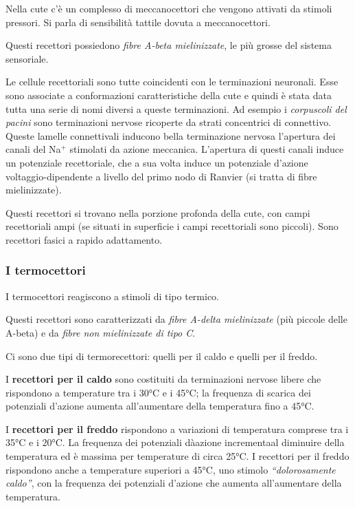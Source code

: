 \documentclass[]{article}
\begin{document}
Nella cute c'è un complesso di meccanocettori che vengono attivati da
stimoli pressori. Si parla di sensibilità tattile dovuta a
meccanocettori.

Questi recettori possiedono \emph{fibre A-beta mielinizzate}, le più
grosse del sistema sensoriale.

Le cellule recettoriali sono tutte coincidenti con le terminazioni
neuronali. Esse sono associate a conformazioni caratteristiche della
cute e quindi è stata data tutta una serie di nomi diversi a queste
terminazioni. Ad esempio i \emph{corpuscoli del pacini} sono
terminazioni nervose ricoperte da strati concentrici di connettivo.
Queste lamelle connettivali inducono bella terminazione nervosa
l'apertura dei canali del Na\(^+\) stimolati da azione meccanica.
L'apertura di questi canali induce un potenziale recettoriale, che a sua
volta induce un potenziale d'azione voltaggio-dipendente a livello del
primo nodo di Ranvier (si tratta di fibre mielinizzate).

Questi recettori si trovano nella porzione profonda della cute, con
campi recettoriali ampi (se situati in superficie i campi recettoriali
sono piccoli). Sono recettori fasici a rapido adattamento.

\subsubsection{I termocettori}\label{i-termocettori}

I termocettori reagiscono a stimoli di tipo termico.

Questi recettori sono caratterizzati da \emph{fibre A-delta
mielinizzate} (più piccole delle A-beta) e da \emph{fibre non
mielinizzate di tipo C}.

Ci sono due tipi di termorecettori: quelli per il caldo e quelli per il
freddo.

I \textbf{recettori per il caldo} sono costituiti da terminazioni
nervose libere che rispondono a temperature tra i 30°C e i 45°C; la
frequenza di scarica dei potenziali d'azione aumenta all'aumentare della
temperatura fino a 45°C.

I \textbf{recettori per il freddo} rispondono a variazioni di
temperatura comprese tra i 35°C e i 20°C. La frequenza dei potenziali
dàazione incrementaal diminuire della temperatura ed è massima per
temperature di circa 25°C. I recettori per il freddo rispondono anche a
temperature superiori a 45°C, uno stimolo \emph{``dolorosamente
caldo''}, con la frequenza dei potenziali d'azione che aumenta
all'aumentare della temperatura.
\end{document}
